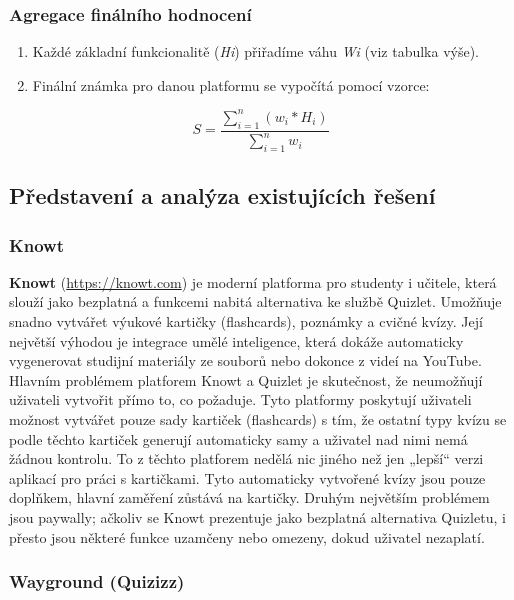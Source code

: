 \documentclass{vskpou} %
\begin{document}
\subsubsection{Agregace finálního hodnocení}

\begin{enumerate}
    \item Každé základní funkcionalitě (\textit{Hi}) přiřadíme váhu \textit{Wi} (viz tabulka výše).
    \item Finální známka pro danou platformu se vypočítá pomocí vzorce:
\end{enumerate}

$$
S = \frac{\sum^n_{i=1}{(w_i*H_i)}}{\sum^n_{i=1}w_i}
$$

\subsection{Představení a analýza existujících řešení}

\subsubsection{Knowt}

\textbf{Knowt} (\url{https://knowt.com}) je moderní platforma pro studenty i učitele, která slouží jako bezplatná a funkcemi nabitá alternativa ke službě Quizlet. Umožňuje snadno vytvářet výukové kartičky (flashcards), poznámky a cvičné kvízy. Její největší výhodou je integrace umělé inteligence, která dokáže automaticky vygenerovat studijní materiály ze souborů nebo dokonce z videí na YouTube. Hlavním problémem platforem Knowt a Quizlet je skutečnost, že neumožňují uživateli vytvořit přímo to, co požaduje. Tyto platformy poskytují uživateli možnost vytvářet pouze sady kartiček (flashcards) s tím, že ostatní typy kvízu se podle těchto kartiček generují automaticky samy a uživatel nad nimi nemá žádnou kontrolu. To z těchto platforem nedělá nic jiného než jen „lepší“ verzi aplikací pro práci s kartičkami. Tyto automaticky vytvořené kvízy jsou pouze doplňkem, hlavní zaměření zůstává na kartičky. Druhým největším problémem jsou paywally; ačkoliv se Knowt prezentuje jako bezplatná alternativa Quizletu, i přesto jsou některé funkce uzamčeny nebo omezeny, dokud uživatel nezaplatí.

\subsubsection{Wayground (Quizizz)}
\end{document}
